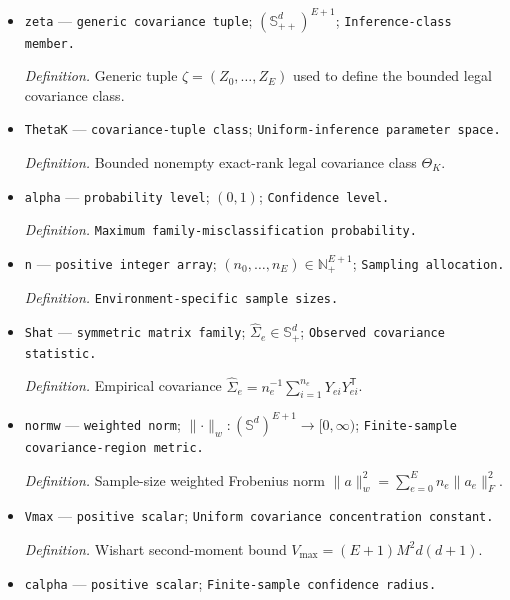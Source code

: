 \documentclass{article}
\begin{document}
\begin{itemize}
  \par\smallskip\noindent\emph{Definition.} \texttt{Uniform upper covariance eigenvalue bound.}
  \item \texttt{zeta} --- \texttt{generic covariance tuple}; \((\mathbb S_{++}^d)^{E+1}\); \texttt{Inference-\allowbreak{}class member.}
  \par\smallskip\noindent\emph{Definition.} Generic tuple \(\zeta=(Z_0,\ldots,Z_E)\) used to define the bounded legal covariance class.
  \item \texttt{ThetaK} --- \texttt{covariance-\allowbreak{}tuple class}; \texttt{Uniform-\allowbreak{}inference parameter space.}
  \par\smallskip\noindent\emph{Definition.} Bounded nonempty exact-rank legal covariance class \(\Theta_K\).
  \item \texttt{alpha} --- \texttt{probability level}; \((0,1)\); \texttt{Confidence level.}
  \par\smallskip\noindent\emph{Definition.} \texttt{Maximum family-\allowbreak{}misclassification probability.}
  \item \texttt{n} --- \texttt{positive integer array}; \((n_0,\ldots,n_E)\in\mathbb N_{+}^{E+1}\); \texttt{Sampling allocation.}
  \par\smallskip\noindent\emph{Definition.} \texttt{Environment-\allowbreak{}specific sample sizes.}
  \item \texttt{Shat} --- \texttt{symmetric matrix family}; \(\widehat\Sigma_e\in\mathbb S_{+}^d\); \texttt{Observed covariance statistic.}
  \par\smallskip\noindent\emph{Definition.} Empirical covariance \(\widehat\Sigma_e=n_e^{-1}\sum_{i=1}^{n_e}Y_{ei}Y_{ei}^{\mathsf T}\).
  \item \texttt{normw} --- \texttt{weighted norm}; \(\lVert\cdot\rVert_w:(\mathbb S^d)^{E+1}\to[0,\infty)\); \texttt{Finite-\allowbreak{}sample covariance-\allowbreak{}region metric.}
  \par\smallskip\noindent\emph{Definition.} Sample-size weighted Frobenius norm \(\lVert a\rVert_w^2=\sum_{e=0}^{E}n_e\lVert a_e\rVert_F^2\).
  \item \texttt{Vmax} --- \texttt{positive scalar}; \texttt{Uniform covariance concentration constant.}
  \par\smallskip\noindent\emph{Definition.} Wishart second-moment bound \(V_{\max}=(E+1)M^2d(d+1)\).
  \item \texttt{calpha} --- \texttt{positive scalar}; \texttt{Finite-\allowbreak{}sample confidence radius.}

\end{itemize}
\end{document}
